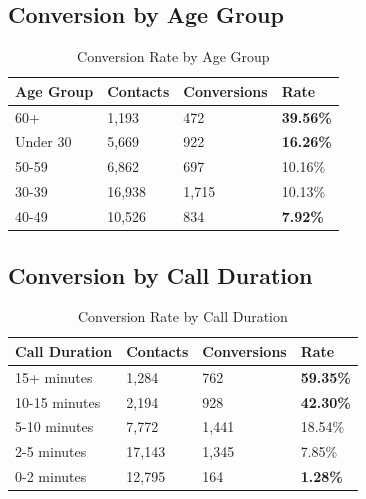 \documentclass[11pt,a4paper]{article}
\begin{document}
\subsection{Conversion by Age Group}

\begin{table}[H]
\centering
\begin{tabular}{p{4cm} p{2.5cm} p{2.5cm} p{2.5cm}}
\toprule
\rowcolor{primary!10}
\textbf{Age Group} & \textbf{Contacts} & \textbf{Conversions} & \textbf{Rate} \\
\midrule
\rowcolor{conversiongreen!15}
60+ & 1,193 & 472 & \textcolor{conversiongreen}{\textbf{39.56\%}} \\
Under 30 & 5,669 & 922 & \textcolor{conversiongreen}{\textbf{16.26\%}} \\
50-59 & 6,862 & 697 & 10.16\% \\
30-39 & 16,938 & 1,715 & 10.13\% \\
\rowcolor{dropred!15}
40-49 & 10,526 & 834 & \textcolor{dropred}{\textbf{7.92\%}} \\
\bottomrule
\end{tabular}
\caption{Conversion Rate by Age Group}
\end{table}

\subsection{Conversion by Call Duration}

\begin{table}[H]
\centering
\begin{tabular}{p{4cm} p{2.5cm} p{2.5cm} p{2.5cm}}
\toprule
\rowcolor{primary!10}
\textbf{Call Duration} & \textbf{Contacts} & \textbf{Conversions} & \textbf{Rate} \\
\midrule
\rowcolor{conversiongreen!15}
15+ minutes & 1,284 & 762 & \textcolor{conversiongreen}{\textbf{59.35\%}} \\
10-15 minutes & 2,194 & 928 & \textcolor{conversiongreen}{\textbf{42.30\%}} \\
5-10 minutes & 7,772 & 1,441 & 18.54\% \\
2-5 minutes & 17,143 & 1,345 & 7.85\% \\
\rowcolor{dropred!15}
0-2 minutes & 12,795 & 164 & \textcolor{dropred}{\textbf{1.28\%}} \\
\bottomrule
\end{tabular}
\caption{Conversion Rate by Call Duration}
\end{table}
\end{document}
